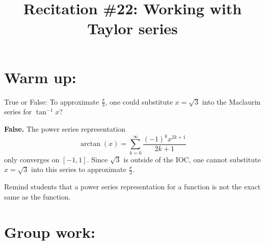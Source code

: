 \documentclass[handout]{ximera}
\title{Recitation \#22: Working with Taylor series}
\begin{document}
\begin{abstract}		\end{abstract}
\maketitle



\section{Warm up:}
True or False:  To approximate $\frac{\pi}{3}$, one could substitute $x = \sqrt{3}$ into the Maclaurin series for $\tan^{-1}x$?
	\begin{freeResponse}
	{\bf False.}  The power series representation 
		\[
		\arctan(x) = \sum_{k=0}^\infty \frac{(-1)^k x^{2k+1}}{2k+1}
		\]
	only converges on $[-1,1]$.  
	Since $\sqrt{3}$ is outside of the IOC, one cannot substitute $x=\sqrt{3}$ into this series to approximate $\frac{\pi}{3}$.  
	\end{freeResponse}	
\begin{instructorNotes}
Remind students that a power series representation for a function is not the exact same as the function.
\end{instructorNotes}







\section{Group work:}
\end{document}

